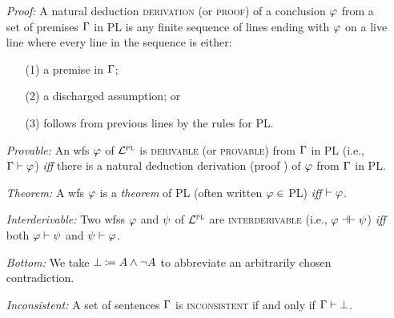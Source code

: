 \documentclass[a4paper, 11pt]{article} %
\begin{document}
\begin{enumerate}
  \item[\it Proof:] A natural deduction \textsc{derivation} (or \textsc{proof}) of a conclusion $\varphi$ from a set of premises $\Gamma$ in PL is any finite sequence of lines ending with $\varphi$ on a live line where every line in the sequence is either:
      \begin{itemize}
        \item[(1)] a premise in $\Gamma$; 
        \item[(2)] a discharged assumption; or
        \item[(3)] follows from previous lines by the rules for PL.
      \end{itemize}
  \item[\it Provable:] An wfs $\varphi$ of $\mathcal{L}^{\textsc{pl}}$ is \textsc{derivable} (or \textsc{provable}) from $\Gamma$ in PL (i.e., $\Gamma \vdash \varphi$) \textit{iff} there is a natural deduction derivation (proof ) of $\varphi$ from $\Gamma$ in PL. 
  \item[\it Theorem:] A wfs $\varphi$ is a \textit{theorem} of PL (often written $\varphi \in$ PL) \textit{iff} $\vdash \varphi$. 
  \item[\it Interderivable:] Two wfss $\varphi$ and $\psi$ of $\mathcal{L}^{\textsc{pl}}$ are \textsc{interderivable} (i.e., $\varphi \dashv\vdash \psi$) \textit{iff} both $\varphi\vdash\psi$ and $\psi\vdash\varphi$.
  \item[\it Bottom:] We take $\bot \coloneq A\wedge\neg A$ to abbreviate an arbitrarily chosen contradiction.
  \item[\it Inconsistent:] A set of sentences $\Gamma$ is \textsc{inconsistent} if and only if $\Gamma\vdash\bot$.
\end{enumerate}
\end{document}
